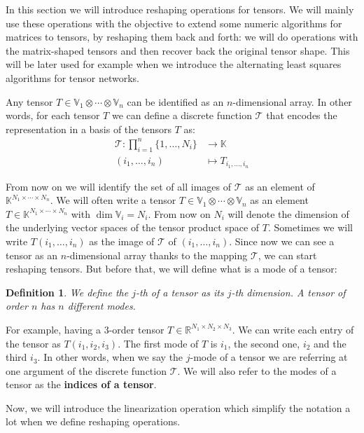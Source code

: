 \documentclass[11pt,a4paper,openright,oneside]{book}
\numberwithin{equation}{section}
\newtheorem{defn0}{Definition}[chapter]
\newenvironment{definition}{ \begin{defn0}}{\end{defn0}}
\begin{document}
In this section we will introduce reshaping operations for tensors. We will mainly use these
operations with the objective to extend some numeric algorithms for
matrices to tensors, by reshaping them back and forth: we will do operations with the matrix-shaped tensors and then recover
back the original tensor shape. This will be later used for example when we introduce the alternating least squares algorithms for tensor networks.

Any tensor $T \in \mathbb{V}_1 \otimes \cdots \otimes \mathbb{V}_n$ can be identified as an $n$-dimensional array. In other words, for each
tensor $T$ we can define a discrete function $\mathcal{T}$ that encodes the representation in a basis of the tensors $T$ as:
$$\begin{align}
    \mathcal{T}: \prod_{i=1}^n \{1, \dots, N_i\} & \longrightarrow \mathbb{K} \\
    (i_1, \dots, i_n) & \longmapsto T_{i_1, \dots, i_n}
\end{align}$$

From now on we will identify the set of all images of $\mathcal{T}$ as
an element of ${\mathbb{K}^{N_1 \times \cdots \times N_n}}$.
We will often write a tensor $T \in \mathbb{V}_1 \otimes \cdots \otimes \mathbb{V}_n$ as an element $T \in \mathbb{K}^{N_1 \times \cdots \times N_n}$
with $\dim \mathbb{V}_i = N_i$. From now on $N_i$ will denote the dimension of the underlying vector spaces
of the tensor product space of $T$. Sometimes we will write $T(i_1, \dots, i_n)$ as the image of $\mathcal{T}$ of $(i_1, \dots, i_n)$.
Since now we can see a tensor as an $n$-dimensional array thanks to the mapping $\mathcal{T}$, we can 
start reshaping tensors. But before that, we will define what is a mode of a tensor:

\begin{definition}
We define the $j$-th of a tensor as its $j$-th dimension. A tensor of order $n$ has $n$ different modes.
\end{definition}

For example, having a $3$-order tensor $T \in \mathbb{R}^{N_1 \times N_2 \times N_3}$. We can write each entry of the tensor
as $T(i_1, i_2, i_3)$. The first mode of $T$ is $i_1$, the second one, $i_2$ and the third $i_3$. In other words, when we say
the $j$-mode of a tensor we are referring at one argument of the discrete function $\mathcal{T}$. We will also refer to the
modes of a tensor as the \textbf{indices of a tensor}.


Now, we will introduce the linearization operation which simplify the notation a lot when we define
reshaping operations.
\end{document}
